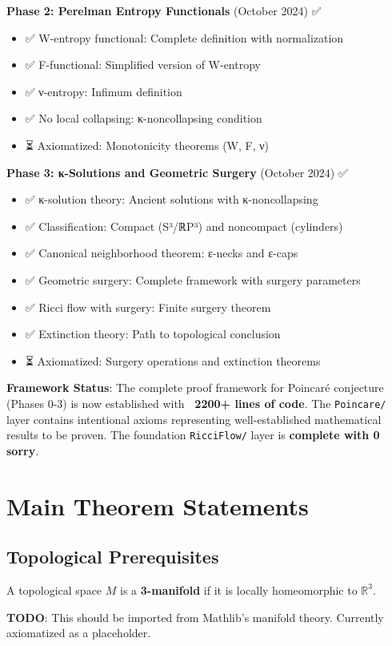 \textbf{Phase 2: Perelman Entropy Functionals} (October 2024) ✅

\begin{itemize}
\item ✅ W-entropy functional: Complete definition with normalization
\item ✅ F-functional: Simplified version of W-entropy
\item ✅ ν-entropy: Infimum definition
\item ✅ No local collapsing: κ-noncollapsing condition
\item ⏳ Axiomatized: Monotonicity theorems (W, F, ν)
\end{itemize}

\textbf{Phase 3: κ-Solutions and Geometric Surgery} (October 2024) ✅

\begin{itemize}
\item ✅ κ-solution theory: Ancient solutions with κ-noncollapsing
\item ✅ Classification: Compact (S³/ℝP³) and noncompact (cylinders)
\item ✅ Canonical neighborhood theorem: ε-necks and ε-caps
\item ✅ Geometric surgery: Complete framework with surgery parameters
\item ✅ Ricci flow with surgery: Finite surgery theorem
\item ✅ Extinction theory: Path to topological conclusion
\item ⏳ Axiomatized: Surgery operations and extinction theorems
\end{itemize}

\textbf{Framework Status}: The complete proof framework for Poincaré conjecture (Phases 0-3) is now established with \textbf{~2200+ lines of code}. The \texttt{Poincare/} layer contains intentional axioms representing well-established mathematical results to be proven. The foundation \texttt{RicciFlow/} layer is \textbf{complete with 0 sorry}.

\chapter{Main Theorem Statements}
\label{chap:poincare_theorems}

\section{Topological Prerequisites}

\begin{definition}[3-Manifold]
\label{def:3manifold}
A topological space $M$ is a \textbf{3-manifold} if it is locally homeomorphic to $\mathbb{R}^3$.

\textbf{TODO}: This should be imported from Mathlib's manifold theory. Currently axiomatized as a placeholder.
\end{definition}

